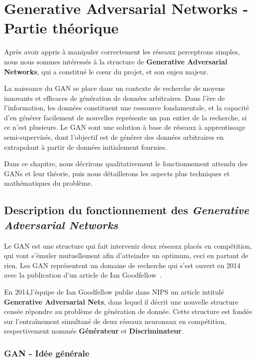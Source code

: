 \chapter{Generative Adversarial Networks - Partie théorique}

Après avoir appris à manipuler correctement les réseaux perceptrons simples, nous nous sommes intéressés à la structure de \textbf{Generative Adversarial Networks}, qui a constitué le cœur du projet, et son enjeu majeur. 

La naissance du GAN se place dans un contexte de recherche de moyens innovants et efficaces de génération de données arbitraires. Dans l'ère de l'information, les données constituent une ressource fondamentale, et la capacité d'en générer facilement de nouvelles représente un pan entier de la recherche, si ce n'est plusieurs. Le GAN sont une solution à base de réseaux à apprentissage semi-supervisés, dont l'objectif est de générer des données arbitraires en extrapolant à partir de données initialement fournies.

Dans ce chapitre, nous décrirons qualitativement le fonctionnement attendu des GANs et leur théorie, puis nous détaillerons les aspects plus techniques et mathématiques du problème. 

\section{Description du fonctionnement des \textit{Generative Adversarial Networks}}

Le GAN est une structure qui fait intervenir deux réseaux placés en compétition, qui vont s'émuler mutuellement afin d'atteindre un optimum, ceci en partant de rien. Les GAN représentent un domaine de recherche qui s'est ouvert en 2014 avec la publication d'un article de Ian Goodfellow \cite{goodfellow_generative_2014}.

En 2014,l'équipe de Ian Goodfellow publie dans NIPS un article intitulé \textbf{Generative Adversarial Nets}, dans lequel il décrit une nouvelle structure censée répondre au problème de génération de donnée. Cette structure est fondée sur l'entraînement simultané de deux réseaux neuronaux en compétition, respectivement nommés \textbf{Générateur} et \textbf{Discriminateur}.  


\subsection{GAN - Idée générale}

